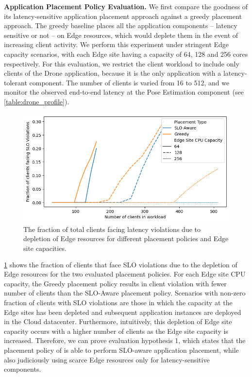 \par \noindent \textbf{Application Placement Policy Evaluation. }We first compare the goodness of its latency-sensitive application placement approach against a greedy placement approach.  The greedy baseline places all the application components -- latency sensitive or not  -- on Edge resources, which would deplete them in the event of increasing client activity. We perform this experiment under stringent Edge capacity scenarios, with each Edge site having a capacity of 64, 128 and 256 cores respectively. For this evaluation, we restrict the client workload to include only clients of the Drone application, because it is the only application with a latency-tolerant component. The number of clients is varied from 16 to 512, and we monitor the observed end-to-end latency at the Pose Estimation component (see \cref{table:drone_profile}). 
\begin{figure}[ht]
  \centering
    \includegraphics[width=0.8\columnwidth]{figures/oneedge/violations_wrt_greedy_vs_num_clients.png}
    \caption{The fraction of total clients facing latency violations due to depletion of Edge resources for different placement policies and Edge site capacities.}
    \label{fig:oneedge_placement}
\end{figure}
\cref{fig:oneedge_placement} shows the fraction of clients that face SLO violations due to the depletion of Edge resources for the two evaluated placement policies. For each Edge site CPU capacity, the Greedy placement policy results in client violation with fewer number of clients than the SLO-Aware placement policy. Scenarios with non-zero fraction of clients with SLO violations are those in which the capacity at the Edge sites has been depleted and subsequent application instances are deployed in the Cloud datacenter. Furthermore, intuitively, this depletion of Edge site capacity occurs with a higher number of clients as the Edge site capacity is increased. Therefore, we can prove evaluation hypothesis 1, which states that the placement policy of \oneedge{} is able to perform SLO-aware application placement, while also judiciously using scarce Edge resources only for latency-sensitive components.\\

